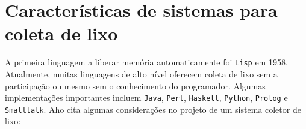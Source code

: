 \documentclass[ccc, pg2]{esinucpel}
\begin{document}





\section{Características de sistemas para coleta de lixo}
A primeira linguagem a liberar memória automaticamente foi \texttt{Lisp} em 1958. Atualmente, muitas linguagens de alto nível oferecem coleta de lixo sem a participação ou mesmo sem o conhecimento do programador. Algumas implementações importantes incluem \texttt{Java}, \texttt{Perl}, \texttt{Haskell}, \texttt{Python}, \texttt{Prolog} e \texttt{Smalltalk}. Aho \cite{bib:aho:comp} cita algumas considerações no projeto de um sistema coletor de lixo:
\end{document}
